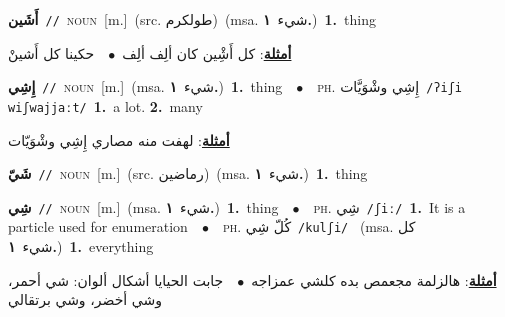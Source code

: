 \documentclass[10pt,a4paper,twoside]{article} %
\begin{document}
\begin{multicols}{2}
{\setlength\topsep{0pt}\textbf{\foreignlanguage{arabic}{أَشَين}}\ {\color{gray}\texttt{//}\color{black}}\ \textsc{noun}\ [m.]\ (src. \color{gray}\foreignlanguage{arabic}{طولكرم}\color{black})\ \color{gray}(msa. \foreignlanguage{arabic}{شيء}~\foreignlanguage{arabic}{\textbf{١.}})\color{black}\ \textbf{1.}~thing\  \begin{flushright}\color{gray}\foreignlanguage{arabic}{\textbf{\underline{\foreignlanguage{arabic}{أمثلة}}}: كل أَشِْين كان ألِف ألِف\ $\bullet$\ \  حكينا كل أَشينْ}\end{flushright}\color{black}} \vspace{2mm}

{\setlength\topsep{0pt}\textbf{\foreignlanguage{arabic}{إِشِي}}\ {\color{gray}\texttt{//}\color{black}}\ \textsc{noun}\ [m.]\ \color{gray}(msa. \foreignlanguage{arabic}{شيء}~\foreignlanguage{arabic}{\textbf{١.}})\color{black}\ \textbf{1.}~thing\ \ $\bullet$\ \ \textsc{ph.} \color{gray} \foreignlanguage{arabic}{إِشِي وشْوَيَّات}\color{black}\ {\color{gray}\texttt{/{\sffamily ʔiʃi wiʃwajjaːt}/}\color{black}}\ \textbf{1.}~a lot.  \textbf{2.}~many\  \begin{flushright}\color{gray}\foreignlanguage{arabic}{\textbf{\underline{\foreignlanguage{arabic}{أمثلة}}}: لهفت منه مصاري إِشِي وشْوَيّات}\end{flushright}\color{black}} \vspace{2mm}

{\setlength\topsep{0pt}\textbf{\foreignlanguage{arabic}{شَيّ}}\ {\color{gray}\texttt{//}\color{black}}\ \textsc{noun}\ [m.]\ (src. \color{gray}\foreignlanguage{arabic}{رماضين}\color{black})\ \color{gray}(msa. \foreignlanguage{arabic}{شيء}~\foreignlanguage{arabic}{\textbf{١.}})\color{black}\ \textbf{1.}~thing\ } \vspace{2mm}

{\setlength\topsep{0pt}\textbf{\foreignlanguage{arabic}{شِي}}\ {\color{gray}\texttt{//}\color{black}}\ \textsc{noun}\ [m.]\ \color{gray}(msa. \foreignlanguage{arabic}{شيء}~\foreignlanguage{arabic}{\textbf{١.}})\color{black}\ \textbf{1.}~thing\ \ $\bullet$\ \ \textsc{ph.} \color{gray} \foreignlanguage{arabic}{شِي}\color{black}\ {\color{gray}\texttt{/{\sffamily ʃiː}/}\color{black}}\ \textbf{1.}~It is a particle used for enumeration\ \ $\bullet$\ \ \textsc{ph.} \color{gray} \foreignlanguage{arabic}{كُلّ شِي}\color{black}\ {\color{gray}\texttt{/{\sffamily kulʃi}/}\color{black}}\ \color{gray} (msa. \foreignlanguage{arabic}{كل شيء}~\foreignlanguage{arabic}{\textbf{١.}})\color{black}\ \textbf{1.}~everything\  \begin{flushright}\color{gray}\foreignlanguage{arabic}{\textbf{\underline{\foreignlanguage{arabic}{أمثلة}}}: هالزلمة مجعمص بده كلشي عمزاجه\ $\bullet$\ \  جابت الحيايا أشكال ألوان: شي أحمر، وشي أخضر، وشي برتقالي}\end{flushright}\color{black}} \vspace{2mm}


\end{multicols}
\end{document}
